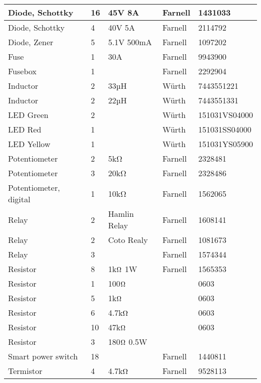 \begin{center}
\begin{tabularx}{\textwidth}{|X|l|l|l|l|}
    Diode, Schottky & 16 & 45V 8A & Farnell & 1431033 \\ \hline
    Diode, Schottky & 4 & 40V 5A & Farnell & 2114792 \\ \hline
    Diode, Zener & 5 & 5.1V 500mA & Farnell & 1097202 \\ \hline
    Fuse & 1 & 30A & Farnell & 9943900\\ \hline
    Fusebox & 1 & & Farnell & 2292904 \\ \hline
    Inductor & 2 & 33µH & Würth & 7443551221 \\ \hline
    Inductor & 2 & 22µH & Würth & 7443551331 \\ \hline
    LED Green & 2 & & Würth & 151031VS04000 \\ \hline
    LED Red & 1 & & Würth & 151031SS04000 \\ \hline
    LED Yellow & 1 & & Würth & 151031YS05900 \\ \hline
    Potentiometer & 2 & 5kΩ  & Farnell & 2328481 \\ \hline
    Potentiometer & 3 & 20kΩ & Farnell & 2328486 \\ \hline
    Potentiometer, digital & 1 & 10kΩ & Farnell & 1562065 \\ \hline
    Relay & 2 & Hamlin Relay & Farnell & 1608141\\ \hline
    Relay & 2 & Coto Realy & Farnell & 1081673 \\ \hline
    Relay & 3 & & Farnell & 1574344 \\ \hline
    Resistor & 8 & 1k$\ohm$ 1W & Farnell & 1565353 \\ \hline
    Resistor & 1 & 100$\ohm$ & & 0603  \\ \hline
    Resistor & 5 & 1k$\ohm$ & & 0603  \\ \hline
    Resistor & 6 & 4.7k$\ohm$ & & 0603  \\ \hline
    Resistor & 10 & 47k$\ohm$ & & 0603  \\ \hline
    Resistor & 3 & 180$\ohm$ 0.5W & & \\ \hline
    Smart power switch & 18	 & & Farnell & 1440811 \\ \hline
    Termistor & 4 & 4.7k$\ohm$ & Farnell & 9528113 \\ \hline
	\end{tabularx}
\end{center}

